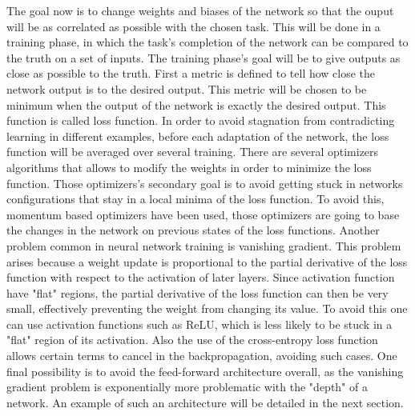 The goal now is to change weights and biases of the network so that the ouput will be as correlated as possible with the chosen task.
This will be done in a training phase, in which the task's completion of the network can be compared to the truth on a set of inputs.
The training phase's goal will be to give outputs as close as possible to the truth.
First a metric is defined to tell how close the network output is to the desired output.
This metric will be chosen to be minimum when the output of the network is exactly the desired output.
This function is called loss function.
In order to avoid stagnation from contradicting learning in different examples, before each adaptation of the network, the loss function will be averaged over several training.
There are several optimizers algorithms that allows to modify the weights in order to minimize the loss function.
Those optimizers's secondary goal is to avoid getting stuck in networks configurations that stay in a local minima of the loss function.
To avoid this, momentum based optimizers have been used, those optimizers are going to base the changes in the network on previous states of the loss functions. 
Another problem common in neural network training is vanishing gradient. This problem arises because a weight update is proportional to the partial derivative of the loss function with respect to the activation of later layers. 
Since activation function have "flat" regions, the partial derivative of the loss function can then be very small, effectively preventing the weight from changing its value.
To avoid this one can use activation functions such as ReLU, which is less likely to be stuck in a "flat" region of its activation. Also the use of the cross-entropy loss function allows certain terms to cancel in the backpropagation, avoiding such cases.
One final possibility is to avoid the feed-forward architecture overall, as the vanishing gradient problem is exponentially more problematic with the "depth" of a network. An example of such an architecture will be detailed in the next section.
